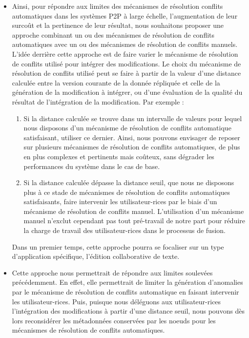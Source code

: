 \begin{itemize}
    \item Ainsi, pour répondre aux limites des mécanismes de résolution conflits automatiques dans les systèmes \ac{P2P} à large échelle, \ie l'augmentation de leur surcoût et la pertinence de leur résultat, nous souhaitons proposer une approche combinant un ou des mécanismes de résolution de conflits automatiques avec un ou des mécanismes de résolution de conflits manuels.
        L'idée derrière cette approche est de faire varier le mécanisme de résolution de conflits utilisé pour intégrer des modifications.
        Le choix du mécanisme de résolution de conflits utilisé peut se faire à partir de la valeur d'une distance calculée entre la version courante de la donnée répliquée et celle de la génération de la modification à intégrer, ou d'une évaluation de la qualité du résultat de l'intégration de la modification.
        Par exemple :
        \begin{enumerate}
            \item Si la distance calculée se trouve dans un intervalle de valeurs pour lequel nous disposons d'un mécanisme de résolution de conflits automatique satisfaisant, utiliser ce dernier.
                Ainsi, nous pouvons envisager de reposer sur plusieurs mécanismes de résolution de conflits automatiques, de plus en plus complexes et pertinents mais coûteux, sans dégrader les performances du système dans le cas de base.
            \item Si la distance calculée dépasse la distance seuil, \ie que nous ne disposons plus à ce stade de mécanismes de résolution de conflits automatiques satisfaisants, faire intervenir les utilisateur-rices par le biais d'un mécanisme de résolution de conflits manuel.
                L'utilisation d'un mécanisme manuel n'exclut cependant pas tout pré-travail de notre part pour réduire la charge de travail des utilisateur-rices dans le processus de fusion.
        \end{enumerate}
        Dans un premier temps, cette approche pourra se focaliser sur un type d'application spécifique, \eg l'édition collaborative de texte.
    \item Cette approche nous permettrait de répondre aux limites soulevées précédemment.
        En effet, elle permettrait de limiter la génération d'anomalies par le mécanisme de résolution de conflits automatique en faisant intervenir les utilisateur-rices.
        Puis, puisque nous déléguons aux utilisateur-rices l'intégration des modifications à partir d'une distance seuil, nous pouvons dès lors reconsidérer les métadonnées conservées par les noeuds pour les mécanismes de résolution de conflits automatiques.

\end{itemize}
